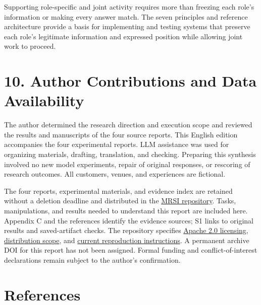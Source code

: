 \documentclass[10pt,a4paper]{article}
\begin{document}
Supporting role-specific and joint activity requires more than freezing each role's information or making every answer match. The seven principles and reference architecture provide a basis for implementing and testing systems that preserve each role's legitimate information and expressed position while allowing joint work to proceed.

\section{10. Author Contributions and Data Availability}\label{two-role-failure-design-author-contributions-and-data-availability}

The author determined the research direction and execution scope and reviewed the results and manuscripts of the four source reports. This English edition accompanies the four experimental reports. LLM assistance was used for organizing materials, drafting, translation, and checking. Preparing this synthesis involved no new model experiments, repair of original responses, or rescoring of research outcomes. All customers, venues, and experiences are fictional.

The four reports, experimental materials, and evidence index are retained without a deletion deadline and distributed in the \href{https://github.com/metaSATOKEN/MRSI}{MRSI repository}. Tasks, manipulations, and results needed to understand this report are included here. Appendix C and the references identify the evidence sources; S1 links to original results and saved-artifact checks. The repository specifies \href{https://github.com/metaSATOKEN/MRSI/blob/9443de315d283874df0c27e0e99b8c04f400709d/LICENSE_STATUS.md}{Apache 2.0 licensing}, \href{https://github.com/metaSATOKEN/MRSI/blob/9443de315d283874df0c27e0e99b8c04f400709d/PUBLICATION_SCOPE.md}{distribution scope}, and \href{https://github.com/metaSATOKEN/MRSI/blob/9443de315d283874df0c27e0e99b8c04f400709d/RUNNING.md}{current reproduction instructions}. A permanent archive DOI for this report has not been assigned. Formal funding and conflict-of-interest declarations remain subject to the author's confirmation.

\clearpage

\begingroup\raggedright

\section{References}\label{two-role-failure-design-references}
\end{document}
